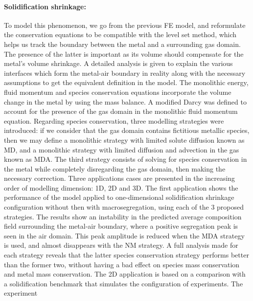 \paragraph{Solidification shrinkage:}
To model this phenomenon, we go from the previous FE model, and reformulate the conservation equations to be compatible with the level set method,
which helps us track the boundary between the metal and a surrounding gas domain. The presence of the latter is important as its volume should compensate
for the metal's volume shrinkage. A detailed analysis is given to explain the various interfaces which form the metal-air boundary in reality along
with the necessary assumptions to get the equivalent definition in the model.
The monolithic energy, fluid momentum and species conservation equations incorporate the volume change in the metal by using the mass balance.
A modified Darcy was defined to account for the presence of the gas domain in the monolithic fluid momentum equation.
Regarding species conservation, three modelling strategies were introduced: if we consider that the gas domain contains fictitious metallic species, 
then we may define a monolithic strategy with limited solute diffusion known as MD, and a monolithic strategy with limited diffusion and advection in the gas known as MDA.
The third strategy consists of solving for species conservation in the metal while completely disregarding the gas domain, then making the necessary correction. 
\newline
\newline
Three applications cases are presented in the increasing order of modelling dimension: 1D, 2D and 3D. The first application shows the performance of the model
applied to one-dimensional solidification shrinkage configuration without then with macrosegregation, using each of the 3 proposed strategies.
The results show an instability in the predicted average composition field surrounding the metal-air boundary, where a positive segregation peak is
seen in the air domain. This peak amplitude is reduced when the MDA strategy is used, and almost disappears with the NM strategy. A full analysis 
made for each strategy reveals that the latter species conservation strategy performs better than the former two, without having a bad effect
on species mass conservation and metal mass conservation.
\newline
\newline
The 2D application is based on a comparison with a  solidification benchmark that 
simulates the configuration of \citet{hebditch_observations_1974} experiments. The experiment
